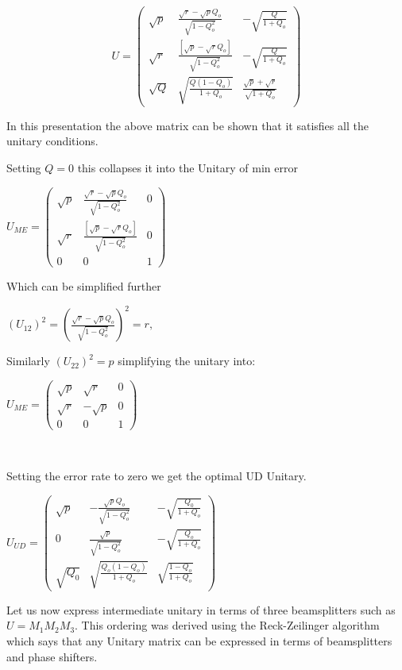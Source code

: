 \documentclass[12pt,oneside,english,reqno]{amsbook}
\numberwithin{section}{chapter}
\numberwithin{equation}{section}
\numberwithin{figure}{section}
\begin{document}
\begin{equation}
U=\begin{pmatrix}\sqrt{p} & \frac{\sqrt{r}-\sqrt{p}Q_{o}}{\sqrt{1-Q_{o}^{2}}} & -\sqrt{\frac{Q}{1+Q_{o}}}\\
\sqrt{r} & \frac{[\sqrt{p}-\sqrt{r}Q_{o}]}{\sqrt{1-Q_{o}^{2}}} & -\sqrt{\frac{Q}{1+Q_{o}}}\\
\sqrt{Q} & \sqrt{\frac{Q(1-Q_{o})}{1+Q_{o}}} & \frac{\sqrt{p}+\sqrt{r}}{\sqrt{1+Q_{o}}}
\end{pmatrix}
\end{equation}


In this presentation the above matrix can be shown that it satisfies
all the unitary conditions. 

Setting $Q=0$ this collapses it into the Unitary of min error 

$U_{ME}=\begin{pmatrix}\sqrt{p} & \frac{\sqrt{r}-\sqrt{p}Q_{o}}{\sqrt{1-Q_{o}^{2}}} & 0\\
\sqrt{r} & \frac{[\sqrt{p}-\sqrt{r}Q_{o}]}{\sqrt{1-Q_{o}^{2}}} & 0\\
0 & 0 & 1
\end{pmatrix}$

Which can be simplified further 

$(U_{12})^{2}=(\frac{\sqrt{r}-\sqrt{p}Q_{o}}{\sqrt{1-Q_{o}^{2}}})^{2}=r,$

Similarly $(U_{22})^{2}=p$ simplifying the unitary into: 

$U_{ME}=\begin{pmatrix}\sqrt{p} & \sqrt{r} & 0\\
\sqrt{r} & -\sqrt{p} & 0\\
0 & 0 & 1
\end{pmatrix}$

$ $

Setting the error rate to zero we get the optimal UD Unitary.

$U_{UD}=\begin{pmatrix}\sqrt{p} & -\frac{\sqrt{p}Q_{o}}{\sqrt{1-Q_{o}^{2}}} & -\sqrt{\frac{Q_{0}}{1+Q_{o}}}\\
0 & \frac{\sqrt{p}}{\sqrt{1-Q_{o}^{2}}} & -\sqrt{\frac{Q_{o}}{1+Q_{o}}}\\
\sqrt{Q_{0}} & \sqrt{\frac{Q_{o}(1-Q_{o})}{1+Q_{o}}} & \sqrt{\frac{1-Q_{o}}{1+Q_{o}}}
\end{pmatrix}$

Let us now express intermediate unitary in terms of three beamsplitters
such as $U=M_{1}M_{2}M_{3}$. This ordering was derived using the
Reck-Zeilinger algorithm which says that any Unitary matrix can be
expressed in terms of beamsplitters and phase shifters. 
\end{document}
